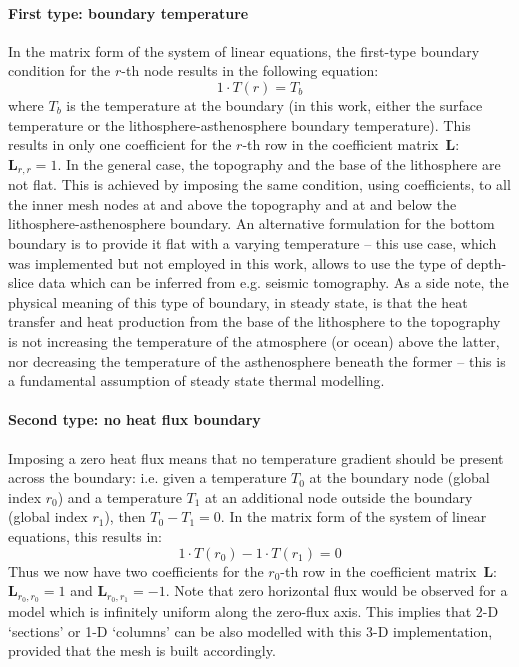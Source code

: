 \paragraph*{First type: boundary temperature}
In the matrix form of the system of linear equations, the first-type boundary condition for the $r$-th node results in the following equation:
\begin{equation}
    \label{suppl:eq:BoundaryT_NodeEq}
    1 \cdot T(r) = T_b
\end{equation}
where $T_b$ is the temperature at the boundary (in this work, either the surface temperature or the lithosphere-asthenosphere boundary temperature).
This results in only one coefficient for the $r$-th row in the coefficient matrix~$\bm{L}$: $\bm{L}_{r,r} = 1$.
In the general case, the topography and the base of the lithosphere are not flat.
This is achieved by imposing the same condition, using coefficients, to all the inner mesh nodes at and above the topography and at and below the lithosphere-asthenosphere boundary.
An alternative formulation for the bottom boundary is to provide it flat with a varying temperature -- this use case, which was implemented but not employed in this work, allows to use the type of depth-slice data which can be inferred from e.g. seismic tomography.
As a side note, the physical meaning of this type of boundary, in steady state, is that the heat transfer and heat production from the base of the lithosphere to the topography is not increasing the temperature of the atmosphere (or ocean) above the latter, nor decreasing the temperature of the asthenosphere beneath the former -- this is a fundamental assumption of steady state thermal modelling.

\paragraph*{Second type: no heat flux boundary}
Imposing a zero heat flux means that no temperature gradient should be present across the boundary: i.e. given a temperature $T_0$ at the boundary node (global index $r_0$) and a temperature $T_1$ at an additional node outside the boundary (global index $r_1$), then $T_0 - T_1 = 0$.
In the matrix form of the system of linear equations, this results in:
\begin{equation}
    \label{suppl:eq:BoundaryQ_NodeEq}
    1 \cdot T(r_0) - 1 \cdot T(r_1) = 0
\end{equation}
Thus we now have two coefficients for the $r_0$-th row in the coefficient matrix~$\bm{L}$: $\bm{L}_{r_0,r_0} = 1$ and $\bm{L}_{r_0,r_1} = -1$.
Note that zero horizontal flux would be observed for a model which is infinitely uniform along the zero-flux axis.
This implies that 2-D `sections' or 1-D `columns' can be also modelled with this 3-D implementation, provided that the mesh is built accordingly.

